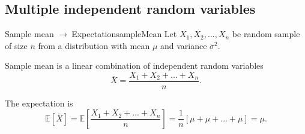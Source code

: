 \documentclass[11pt,a4paper,fleqn]{article}
\numberwithin{equation}{section}
\newcommand{\g}{$\rightarrow\ $}
\newcommand{\mean}[1]{\bar{#1}}
\begin{document}
\subsection{Multiple independent random variables}

\begin{fact}{Sample mean \g  Expectation}{sampleMean}
    Let $X_1,X_2,...,X_n$ be random sample of size $n$ from a distribution with mean $\mu$ and variance $\sigma^2$.
    
    Sample mean is a linear combination of independent random variables
    \begin{equation*}
        \mean{X}=\frac{X_1+X_2+...+X_n}{n}.
    \end{equation*}
    
    The expectation is
    \begin{equation*}
        \mathbb{E}[\mean{X}]=\mathbb{E}[\frac{X_1+X_2+...+X_n}{n}]=\frac{1}{n}[\mu+\mu+...+\mu]=\mu.
    \end{equation*}
\end{fact}
\end{document}
